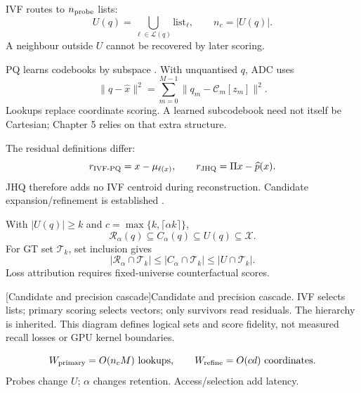 IVF routes to $n_{\rm probe}$ lists:
\[
 U(q)=\bigcup_{\ell\in\mathcal L(q)}\mathrm{list}_\ell,\qquad n_c=|U(q)|.
\]
A neighbour outside $U$ cannot be recovered by later scoring.

PQ learns codebooks by subspace \cite{pq}. With unquantised $q$, ADC uses
\begin{equation}
 \|q-\widehat x\|^2=\sum_{m=0}^{M-1}\|q_m-\mathcal C_m[z_m]\|^2.
 \label{eq:2-adc}
\end{equation}
Lookups replace coordinate scoring. A learned subcodebook need not itself be Cartesian; Chapter 5 relies on that extra structure.

The residual definitions differ:
\[
 r_{\rm IVF\text{-}PQ}=x-\mu_{\ell(x)},\qquad
 r_{\rm JHQ}=\Pi x-\widehat p(x).
\]
JHQ therefore adds no IVF centroid during reconstruction. Candidate expansion/refinement is established \cite{johnson_gpu,faiss_refine}.

With $|U(q)|\geq k$ and $c=\max\{k,\lceil\alpha k\rceil\}$,
\begin{equation}
 \mathcal R_\alpha(q)\subseteq C_\alpha(q)\subseteq U(q)\subseteq\mathcal X.
 \label{eq:2-cascade}
\end{equation}
For GT set $\mathcal T_k$, set inclusion gives
\[
 |\mathcal R_\alpha\cap\mathcal T_k|
 \leq |C_\alpha\cap\mathcal T_k|
 \leq |U\cap\mathcal T_k|.
\]
Loss attribution requires fixed-universe counterfactual scores.

\par\medskip\noindent\begin{minipage}{\linewidth}
\centering\captionsetup{hypcap=false}
\resizebox{\linewidth}{!}{}
[Candidate and precision cascade]{Candidate and precision cascade. IVF selects lists;
primary scoring selects vectors; only survivors read residuals. The hierarchy
is inherited. This diagram defines logical sets and score fidelity,
not measured recall losses or GPU kernel boundaries.}
\label{fig:2-cascade}
\end{minipage}\par\medskip

\[
 W_{\rm primary}=O(n_cM)\ \text{lookups},\qquad
 W_{\rm refine}=O(cd)\ \text{coordinates}.
\]
Probes change $U$; $\alpha$ changes retention. Access/selection add latency.
